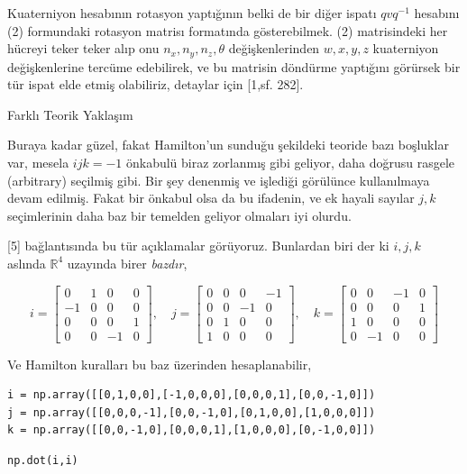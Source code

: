 \documentclass[12pt,fleqn]{article}\usepackage{../../common}
\begin{document}
Kuaterniyon hesabının rotasyon yaptığının belki de bir diğer ispatı $q v q^{-1}$
hesabını (2) formundaki rotasyon matrisı formatında gösterebilmek. (2)
matrisindeki her hücreyi teker teker alıp onu $n_x,n_y,n_z,\theta$
değişkenlerinden $w,x,y,z$ kuaterniyon değişkenlerine tercüme edebilirek, ve bu
matrisin döndürme yaptığını görürsek bir tür ispat elde etmiş olabiliriz,
detaylar için [1,sf. 282].

Farklı Teorik Yaklaşım

Buraya kadar güzel, fakat Hamilton'un sunduğu şekildeki teoride bazı boşluklar
var, mesela $ijk = -1$ önkabulü biraz zorlanmış gibi geliyor, daha doğrusu
rasgele (arbitrary) seçilmiş gibi. Bir şey denenmiş ve işlediği görülünce
kullanılmaya devam edilmiş. Fakat bir önkabul olsa da bu ifadenin, ve ek hayali
sayılar $j,k$ seçimlerinin daha baz bir temelden geliyor olmaları iyi olurdu.

[5] bağlantısında bu tür açıklamalar görüyoruz. Bunlardan biri der ki $i,j,k$
aslında $\mathbb{R}^4$ uzayında birer {\em bazdır},

$$
i = \left[\begin{array}{cccc}
0 & 1 & 0 & 0 \\ -1 & 0 & 0 & 0 \\ 0 & 0 & 0 & 1\\ 0 & 0 & -1 & 0 
\end{array}\right], \quad 
j = \left[\begin{array}{cccc}
0 & 0 & 0 & -1 \\ 0 & 0 & -1 & 0 \\ 0 & 1 & 0 & 0\\ 1 & 0 & 0 & 0 
\end{array}\right], \quad
k = \left[\begin{array}{cccc}
0 & 0 & -1 & 0 \\ 0 & 0 & 0 & 1 \\ 1 & 0 & 0 & 0\\ 0 & -1 & 0 & 0 
\end{array}\right]
$$

Ve Hamilton kuralları bu baz üzerinden hesaplanabilir,

\begin{verbatim}
i = np.array([[0,1,0,0],[-1,0,0,0],[0,0,0,1],[0,0,-1,0]])
j = np.array([[0,0,0,-1],[0,0,-1,0],[0,1,0,0],[1,0,0,0]])
k = np.array([[0,0,-1,0],[0,0,0,1],[1,0,0,0],[0,-1,0,0]])
\end{verbatim}

\begin{verbatim}
np.dot(i,i)
\end{verbatim}
\end{document}
